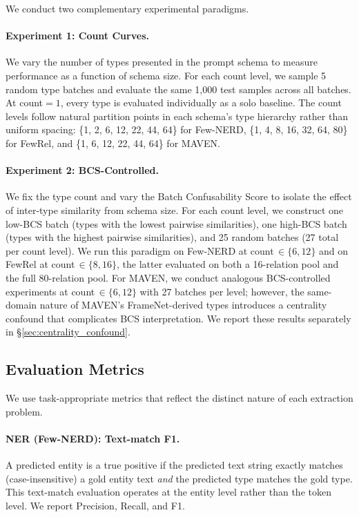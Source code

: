 We conduct two complementary experimental paradigms.

\paragraph{Experiment 1: Count Curves.}
We vary the number of types presented in the prompt schema to measure performance as a function of schema size. For each count level, we sample 5 random type batches and evaluate the same 1{,}000 test samples across all batches. At count${}=1$, every type is evaluated individually as a solo baseline. The count levels follow natural partition points in each schema's type hierarchy rather than uniform spacing: \{1, 2, 6, 12, 22, 44, 64\} for Few-NERD, \{1, 4, 8, 16, 32, 64, 80\} for FewRel, and \{1, 6, 12, 22, 44, 64\} for MAVEN.

\paragraph{Experiment 2: BCS-Controlled.}
We fix the type count and vary the Batch Confusability Score to isolate the effect of inter-type similarity from schema size. For each count level, we construct one low-BCS batch (types with the lowest pairwise similarities), one high-BCS batch (types with the highest pairwise similarities), and 25 random batches (27 total per count level). We run this paradigm on Few-NERD at count$\,\in\{6, 12\}$ and on FewRel at count$\,\in\{8, 16\}$, the latter evaluated on both a 16-relation pool and the full 80-relation pool. For MAVEN, we conduct analogous BCS-controlled experiments at count$\,\in\{6, 12\}$ with 27 batches per level; however, the same-domain nature of MAVEN's FrameNet-derived types introduces a centrality confound that complicates BCS interpretation. We report these results separately in \S\ref{sec:centrality_confound}.

\subsection{Evaluation Metrics}
\label{sec:metrics}

We use task-appropriate metrics that reflect the distinct nature of each extraction problem.

\paragraph{NER (Few-NERD): Text-match F1.}
A predicted entity is a true positive if the predicted text string exactly matches (case-insensitive) a gold entity text \emph{and} the predicted type matches the gold type. This text-match evaluation operates at the entity level rather than the token level. We report Precision, Recall, and F1.

